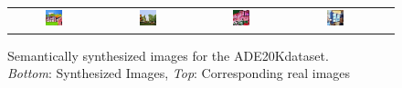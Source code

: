 \begin{figure}
\begin{tabular}{ccccc}
        \includegraphics[width=0.20\textwidth]{Chapters/figures/experiments/ade/ADE_val_00000393_sample.png} & 
        \includegraphics[width=0.20\textwidth]{Chapters/figures/experiments/ade/ADE_val_00001998_sample.png} &
        \includegraphics[width=0.20\textwidth]{Chapters/figures/experiments/ade/ADE_val_00001993_sample.png} &
        \includegraphics[width=0.20\textwidth]{Chapters/figures/experiments/ade/ADE_val_00001430_sample.png}
        
    \end{tabular}
    \caption[Semantically synthesized images for the ADE20Kdataset]{Semantically synthesized images for the ADE20Kdataset. \\\textit{Bottom}: Synthesized Images, \textit{Top}: Corresponding real images}
\end{figure}




